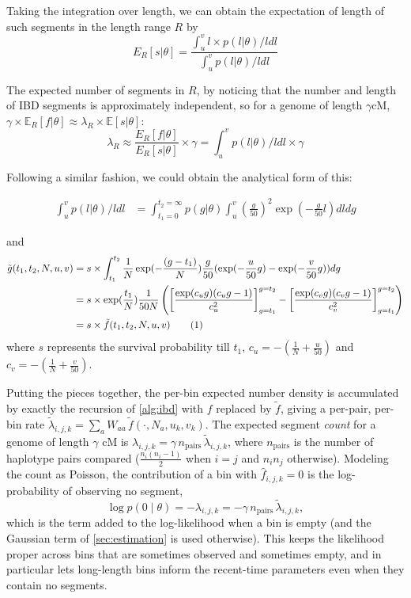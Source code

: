 \documentclass[12pt]{article}
\theoremstyle{definition}
\theoremstyle{definition}
\theoremstyle{lemma}
\theoremstyle{remark}
\theoremstyle{definition}
\newcommand\numberthis{\addtocounter{equation}{1}\tag{\theequation}}
\begin{document}
Taking the integration over length, we can obtain the expectation of length of such segments in the length range $R$ by \[E_{R}[s|\theta] = \frac{\int_u^v l\times p(l|\theta)/l dl}{\int_u^vp(l|\theta)/l dl}\]

The expected number of segments in $R$, by noticing that the number and length of IBD segments is approximately independent, so for a genome of length $\gamma$cM, $\gamma\times \mathbb{E}_R[f|\theta] \approx \lambda_R\times\mathbb{E}[s|\theta]$:
\[\lambda_{R} \approx \frac{E_R[f|\theta]}{E_R[s|\theta]} \times \gamma=\int_u^v p(l|\theta)/l dl \times \gamma\]

Following a similar fashion, we could obtain the analytical form of this:

\begin{align*}
\int_u^v p(l|\theta)/l dl &= \int_{t_1=0}^{t_2=\infty} p(g|\theta)\int_u^v (\frac{g}{50})^2\exp(-\frac{g}{50}l)dl dg
\end{align*}

and \begin{align*}
    \tilde{g}(t_1,t_2, N, u, v) &= s\times\int_{t_1}^{t_2} \frac{1}{N}\exp(-\frac{(g-t_1)}{N})\frac{g}{50}(\exp(-\frac{u}{50}g) - \exp(-\frac{v}{50}g)) dg\\
            &=s\times\exp(\frac{t_1}{N})\frac{1}{50N}\left(\left[\frac{\exp(c_ug)(c_ug-1)}{c_u^2}\right]_{g=t_1}^{g=t_2} - \left[\frac{\exp(c_vg)(c_vg-1)}{c_v^2}\right]_{g=t_1}^{g=t_2}\right)\\
            &= s\times \tilde{f}(t_1,t_2,N,u,v)\numberthis\label{eqn:l/l|theta}
\end{align*}
where $s$ represents the survival probability till $t_1$, $c_u = -\left(\frac{1}{N}+\frac{u}{50}\right)$ and $c_v = -\left(\frac{1}{N}+\frac{v}{50}\right)$.

Putting the pieces together, the per-bin expected number density is accumulated
by exactly the recursion of \cref{alg:ibd} with $f$ replaced by $\tilde f$,
giving a per-pair, per-bin rate $\tilde\lambda_{i,j,k}=\sum_a W_{aa}\,
\tilde f(\cdot,N_a,u_k,v_k)$. The expected segment \emph{count} for a genome of
length $\gamma$ cM is $\lambda_{i,j,k}=\gamma\,n_{\text{pairs}}\,\tilde\lambda_{i,j,k}$,
where $n_{\text{pairs}}$ is the number of haplotype pairs compared
($\tfrac{n_i(n_i-1)}{2}$ when $i=j$ and $n_i n_j$ otherwise). Modeling the count
as Poisson, the contribution of a bin with $\hat f_{i,j,k}=0$ is the log-probability
of observing no segment,
\[
  \log p(0\mid\theta) = -\lambda_{i,j,k}
  = -\gamma\,n_{\text{pairs}}\,\tilde\lambda_{i,j,k},
\]
which is the term added to the log-likelihood when a bin is empty (and the Gaussian
term of \cref{sec:estimation} is used otherwise). This keeps the likelihood proper
across bins that are sometimes observed and sometimes empty, and in particular lets
long-length bins inform the recent-time parameters even when they contain no segments.
\end{document}
